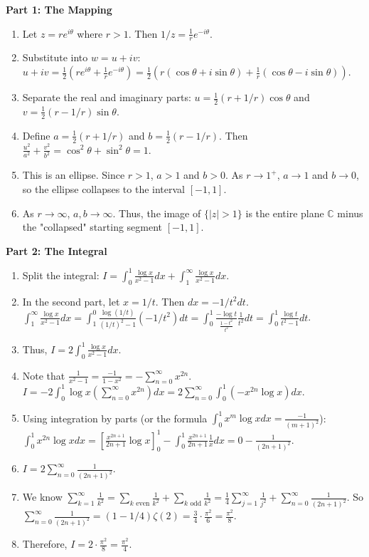 \begin{solution}
\textbf{Part 1: The Mapping}
\begin{enumerate}
    \item Let $z = re^{i\theta}$ where $r > 1$. Then $1/z = \frac{1}{r}e^{-i\theta}$.
    \item Substitute into $w = u + iv$:
    $u + iv = \frac{1}{2}(re^{i\theta} + \frac{1}{r}e^{-i\theta}) = \frac{1}{2}(r(\cos\theta + i\sin\theta) + \frac{1}{r}(\cos\theta - i\sin\theta))$.
    \item Separate the real and imaginary parts:
    $u = \frac{1}{2}(r + 1/r)\cos\theta$ and $v = \frac{1}{2}(r - 1/r)\sin\theta$.
    \item Define $a = \frac{1}{2}(r + 1/r)$ and $b = \frac{1}{2}(r - 1/r)$. Then $\frac{u^2}{a^2} + \frac{v^2}{b^2} = \cos^2\theta + \sin^2\theta = 1$.
    \item This is an ellipse. Since $r > 1$, $a > 1$ and $b > 0$. As $r \to 1^+$, $a \to 1$ and $b \to 0$, so the ellipse collapses to the interval $[-1, 1]$.
    \item As $r \to \infty$, $a, b \to \infty$. Thus, the image of $\{|z| > 1\}$ is the entire plane $\mathbb{C}$ minus the "collapsed" starting segment $[-1, 1]$.
\end{enumerate}
\textbf{Part 2: The Integral}
\begin{enumerate}
    \item Split the integral: $I = \int_0^1 \frac{\log x}{x^2-1} dx + \int_1^\infty \frac{\log x}{x^2-1} dx$.
    \item In the second part, let $x = 1/t$. Then $dx = -1/t^2 dt$.
       $\int_1^\infty \frac{\log x}{x^2-1} dx = \int_1^0 \frac{\log(1/t)}{(1/t)^2-1} (-1/t^2) dt = \int_0^1 \frac{-\log t}{\frac{1-t^2}{t^2}} \frac{1}{t^2} dt = \int_0^1 \frac{\log t}{t^2-1} dt$.
    \item Thus, $I = 2 \int_0^1 \frac{\log x}{x^2-1} dx$.
    \item Note that $\frac{1}{x^2-1} = \frac{-1}{1-x^2} = -\sum_{n=0}^\infty x^{2n}$.
       $I = -2 \int_0^1 \log x \left( \sum_{n=0}^\infty x^{2n} \right) dx = 2 \sum_{n=0}^\infty \int_0^1 (-x^{2n} \log x) dx$.
    \item Using integration by parts (or the formula $\int_0^1 x^m \log x dx = \frac{-1}{(m+1)^2}$):
       $\int_0^1 x^{2n} \log x dx = \left[ \frac{x^{2n+1}}{2n+1}\log x \right]_0^1 - \int_0^1 \frac{x^{2n+1}}{2n+1} \frac{1}{x} dx = 0 - \frac{1}{(2n+1)^2}$.
    \item $I = 2 \sum_{n=0}^\infty \frac{1}{(2n+1)^2}$.
    \item We know $\sum_{k=1}^\infty \frac{1}{k^2} = \sum_{k \text{ even}} \frac{1}{k^2} + \sum_{k \text{ odd}} \frac{1}{k^2} = \frac{1}{4}\sum_{j=1}^\infty \frac{1}{j^2} + \sum_{n=0}^\infty \frac{1}{(2n+1)^2}$.
       So $\sum_{n=0}^\infty \frac{1}{(2n+1)^2} = (1 - 1/4) \zeta(2) = \frac{3}{4} \cdot \frac{\pi^2}{6} = \frac{\pi^2}{8}$.
    \item Therefore, $I = 2 \cdot \frac{\pi^2}{8} = \frac{\pi^2}{4}$.
\end{enumerate}
\end{solution}

